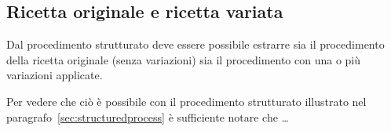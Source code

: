 \subsection{Ricetta originale e ricetta variata}
Dal procedimento strutturato deve essere possibile estrarre sia il procedimento della
ricetta originale (senza variazioni) sia il procedimento con una o più variazioni applicate.

Per vedere che ciò è possibile con il procedimento strutturato illustrato nel
paragrafo~\vref{sec:structuredprocess} è sufficiente notare che \ldots
